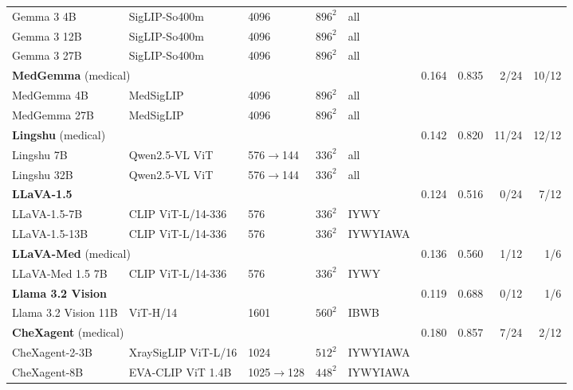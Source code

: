 \documentclass{article}
\begin{document}
\begin{table}[h]
{\begin{tabular}{lllll@{\hspace{8pt}}rrrr}
\quad Gemma 3 4B & SigLIP-So400m & 4096 & $896^2$ & all & & & & \\
\quad Gemma 3 12B & SigLIP-So400m & 4096 & $896^2$ & all & & & & \\
\quad Gemma 3 27B & SigLIP-So400m & 4096 & $896^2$ & all & & & & \\
\midrule
\multicolumn{5}{l}{\textbf{MedGemma} (medical)~\citep{sellergren2025medgemma}} & 0.164 & 0.835 & \cellcolor{cfTerra2}2/24 & \cellcolor{cfTerra3}10/12 \\
\quad MedGemma 4B & MedSigLIP & 4096 & $896^2$ & all & & & & \\
\quad MedGemma 27B & MedSigLIP & 4096 & $896^2$ & all & & & & \\
\midrule
\multicolumn{5}{l}{\textbf{Lingshu} (medical)~\citep{lasa2025lingshu}} & 0.142 & 0.820 & \cellcolor{cfTerra4}11/24 & \cellcolor{cfTerra4}12/12 \\
\quad Lingshu 7B & Qwen2.5-VL ViT & 576$\to$144 & $336^2$ & all & & & & \\
\quad Lingshu 32B & Qwen2.5-VL ViT & 576$\to$144 & $336^2$ & all & & & & \\
\midrule
\multicolumn{5}{l}{\textbf{LLaVA-1.5}~\citep{liu2024improved}} & 0.124 & 0.516 & \cellcolor{cfTerra1}0/24 & \cellcolor{cfTerra3}7/12 \\
\quad LLaVA-1.5-7B & CLIP ViT-L/14-336 & 576 & $336^2$ & IYWY & & & & \\
\quad LLaVA-1.5-13B & CLIP ViT-L/14-336 & 576 & $336^2$ & IYWYIAWA & & & & \\
\midrule
\multicolumn{5}{l}{\textbf{LLaVA-Med} (medical)~\citep{li2023llavamed}} & 0.136 & 0.560 & \cellcolor{cfTerra2}1/12 & \cellcolor{cfTerra2}1/6 \\
\quad LLaVA-Med 1.5 7B & CLIP ViT-L/14-336 & 576 & $336^2$ & IYWY & & & & \\
\midrule
\multicolumn{5}{l}{\textbf{Llama 3.2 Vision}~\citep{meta2024llama32vision}} & 0.119 & 0.688 & \cellcolor{cfTerra1}0/12 & \cellcolor{cfTerra2}1/6 \\
\quad Llama 3.2 Vision 11B & ViT-H/14 & 1601 & $560^2$ & IBWB & & & & \\
\midrule
\multicolumn{5}{l}{\textbf{CheXagent} (medical)~\citep{chen2024chexagent}} & 0.180 & 0.857 & \cellcolor{cfTerra3}7/24 & \cellcolor{cfTerra2}2/12 \\
\quad CheXagent-2-3B & XraySigLIP ViT-L/16 & 1024 & $512^2$ & IYWYIAWA & & & & \\
\quad CheXagent-8B & EVA-CLIP ViT 1.4B & 1025$\to$128 & $448^2$ & IYWYIAWA & & & & \\

\end{tabular}}
\end{table}
\end{document}
